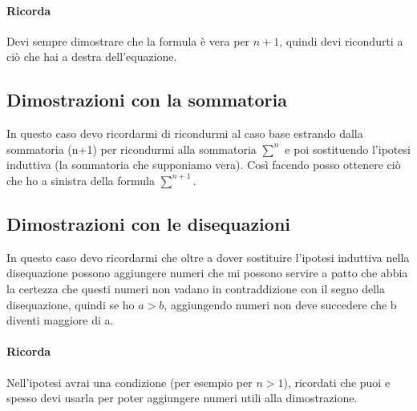 \documentclass[12pt, a4paper]{article}
\begin{document}
	\paragraph*{Ricorda} Devi sempre dimostrare che la formula è vera per $n+1$, quindi devi ricondurti a
	ciò che hai a destra dell'equazione.

	\subsection*{Dimostrazioni con la sommatoria}
	In questo caso devo ricordarmi di ricondurmi al caso base estrando dalla sommatoria (n+1)
	per ricondurmi alla sommatoria $\sum^n$ e poi sostituendo l'ipotesi induttiva
	(la sommatoria che supponiamo vera). Così facendo posso ottenere ciò che ho a sinistra della
	formula $\sum^{n+1}$.
	\subsection*{Dimostrazioni con le disequazioni}
	In questo caso devo ricordarmi che oltre a dover sostituire l'ipotesi induttiva nella disequazione
	possono aggiungere numeri che mi possono servire a patto che abbia la certezza che questi numeri non
	vadano in contraddizione con il segno della disequazione, quindi se ho $a>b$, aggiungendo numeri non deve succedere
	che b diventi maggiore di a.
	\paragraph*{Ricorda} Nell'ipotesi avrai una condizione (per esempio per $n>1$), ricordati che puoi e spesso
devi usarla per poter aggiungere numeri utili alla dimostrazione.
\end{document}
